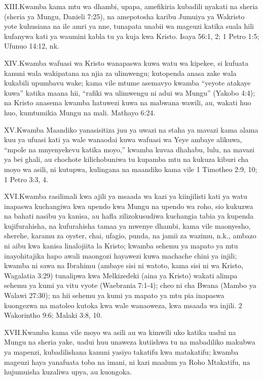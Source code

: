 \lettrine{XIII.} Kwamba kama mtu wa dhambi, upapa, amefikiria kubadili nyakati na sheria (sheria ya Mungu, Danieli 7:25), na amepotosha karibu Jumuiya ya Wakristo yote kuhusiana na ile amri ya nne, tunapata unabii wa mageuzi katika suala hili kufanywa kati ya waumini kabla tu ya kuja kwa Kristo. Isaya 56:1, 2; 1 Petro 1:5; Ufunuo 14:12, nk.


\lettrine{XIV.} Kwamba wafuasi wa Kristo wanapaswa kuwa watu wa kipekee, si kufuata kanuni wala wakipatana na njia za ulimwengu; kutopenda anasa zake wala kukabili upumbavu wake; kama vile mtume asemavyo kwamba “yeyote atakaye kuwa” katika maana hii, “rafiki wa ulimwengu ni adui wa Mungu” (Yakobo 4:4); na Kristo anasema kwamba hatuwezi kuwa na mabwana wawili, au, wakati huo huo, kumtumikia Mungu na mali. Mathayo 6:24.


\lettrine{XV.} Kwamba Maandiko yanasisitiza juu ya uwazi na staha ya mavazi kama alama kuu ya ufuasi kati ya wale wanaodai kuwa wafuasi wa Yeye ambaye alikuwa, “mpole na mnyenyekevu katika moyo,” kwamba kuvaa dhahabu, lulu, na mavazi ya bei ghali, au chochote kilichobuniwa tu kupamba mtu na kukuza kiburi cha moyo wa asili, ni kutupwa, kulingana na maandiko kama vile 1 Timotheo 2:9, 10; 1 Petro 3:3, 4.


\lettrine{XVI.} Kwamba rasilimali kwa ajili ya msaada wa kazi ya kiinjilisti kati ya watu inapaswa kuchangiwa kwa upendo kwa Mungu na upendo wa roho, sio kukuzwa na bahati nasibu ya kanisa, au hafla zilizokusudiwa kuchangia tabia ya kupenda kujifurahisha, na kufurahisha tamaa ya mwenye dhambi, kama vile maonyesho, sherehe, karamu za oyster, chai, ufagio, punda, na jamii za wazimu, n.k., ambazo ni aibu kwa kanisa linalojiita la Kristo; kwamba sehemu ya mapato ya mtu inayohitajika hapo awali maongozi hayawezi kuwa machache chini ya injili; kwamba ni sawa na Ibrahimu (ambaye sisi ni watoto, kama sisi ni wa Kristo, Wagalatia 3:29) tunalipwa kwa Melkizedeki (aina ya Kristo) wakati alimpa sehemu ya kumi ya vitu vyote (Waebrania 7:1-4); cheo ni cha Bwana (Mambo ya Walawi 27:30); na hii sehemu ya kumi ya mapato ya mtu pia inapaswa kuongezwa na matoleo kutoka kwa wale wanaoweza, kwa msaada wa injili. 2 Wakorintho 9:6; Malaki 3:8, 10.


\lettrine{XVII.} Kwamba kama vile moyo wa asili au wa kimwili uko katika uadui na Mungu na sheria yake, uadui huu unaweza kutiishwa tu na mabadiliko makubwa ya mapenzi, kubadilishana kanuni yasiyo takatifu kwa matakatifu; kwamba mageuzi haya yanafuata toba na imani, ni kazi maalum ya Roho Mtakatifu, na hujumuisha kuzaliwa upya, au kuongoka.



